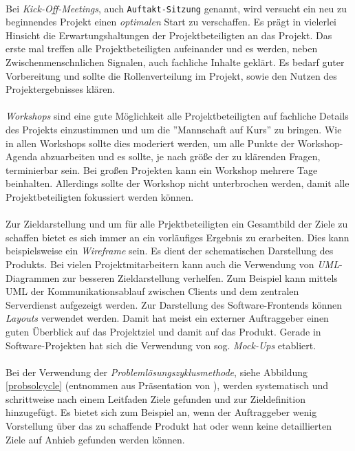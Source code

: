 \documentclass[12pt]{scrartcl}
\begin{document}
\ \\
Bei \textit{Kick-Off-Meetings}, auch \texttt{Auftakt-Sitzung} genannt, wird versucht ein neu zu beginnendes Projekt einen \textit{optimalen} Start zu verschaffen. Es prägt in vielerlei Hinsicht die Erwartungshaltungen der Projektbeteiligten an das Projekt. Das erste mal treffen alle Projektbeteiligten aufeinander und es werden, neben Zwischenmenschnlichen Signalen, auch fachliche Inhalte geklärt. Es bedarf guter Vorbereitung und sollte die Rollenverteilung im Projekt, sowie den Nutzen des Projektergebnisses klären. \\
\\
\textit{Workshops} sind eine gute Möglichkeit alle Projektbeteiligten auf fachliche Details des Projekts einzustimmen und um die ''Mannschaft auf Kurs'' zu bringen. Wie in allen Workshops sollte dies moderiert werden, um alle Punkte der Workshop-Agenda abzuarbeiten und es sollte, je nach größe der zu klärenden Fragen, terminierbar sein. Bei großen Projekten kann ein Workshop mehrere Tage beinhalten. Allerdings sollte der Workshop nicht unterbrochen werden, damit alle Projektbeteiligten fokussiert werden können. \\
\\
Zur Zieldarstellung und um für alle Prjektbeteiligten ein Gesamtbild der Ziele zu schaffen bietet es sich immer an ein vorläufiges Ergebnis zu erarbeiten. Dies kann beispielsweise ein \textit{Wireframe} sein. Es dient der schematischen Darstellung des Produkts. Bei vielen Projektmitarbeitern kann auch die Verwendung von \textit{UML}-Diagrammen zur besseren Zieldarstellung verhelfen. Zum Beispiel kann mittels UML der Kommunikationsablauf zwischen Clients und dem zentralen Serverdienst aufgezeigt werden. Zur Darstellung des Software-Frontends können \textit{Layouts} verwendet werden. Damit hat meist ein externer Auftraggeber einen guten Überblick auf das Projektziel und damit auf das Produkt. Gerade in Software-Projekten hat sich die Verwendung von sog. \textit{Mock-Ups} etabliert. \\
\\
Bei der Verwendung der \textit{Problemlösungszyklusmethode}, siehe Abbildung \ref{probsolcycle} (entnommen aus Präsentation von \cite{slishare_einf_pm}), werden systematisch und schrittweise nach einem Leitfaden Ziele gefunden und zur Zieldefinition hinzugefügt. Es bietet sich zum Beispiel an, wenn der Auftraggeber wenig Vorstellung über das zu schaffende Produkt hat oder wenn keine detaillierten Ziele auf Anhieb gefunden werden können. 
\end{document}
